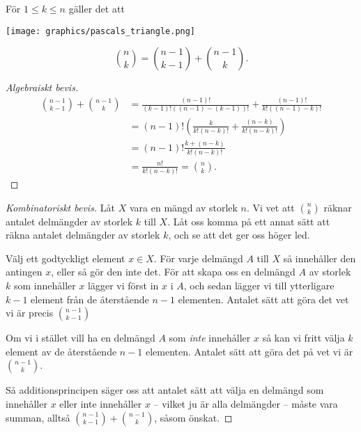 \documentclass[nobib]{tufte-handout}
\begin{document}
\begin{proposition}
  För $1 \leq k \leq n$ gäller det att
  
  \begin{marginfigure}
    \texttt{[image: graphics/pascals\_triangle.png]}
  \end{marginfigure}
  $$\binom{n}{k} = \binom{n-1}{k-1} + \binom{n-1}{k}.$$

  \begin{proof}[Algebraiskt bevis]
    \begin{align*}
      \binom{n-1}{k-1} + \binom{n-1}{k} &= \frac{(n-1)!}{(k-1)!((n-1)-(k-1))!} + \frac{(n-1)!}{k!((n-1)-k)!}\\
      &= (n-1)!\left(\frac{k}{k!(n-k)!} + \frac{(n-k)}{k!(n-k)!}\right)\\
      &= (n-1)!\frac{k + (n - k)}{k!(n-k)!}\\
      &= \frac{n!}{k!(n-k)!} = \binom{n}{k}.
    \end{align*}    
  \end{proof}

  \begin{proof}[Kombinatoriskt bevis]
    Låt $X$ vara en mängd av storlek $n$. Vi vet att $\binom{n}{k}$ räknar antalet delmängder av storlek $k$ till $X$. Låt oss komma på ett annat sätt att räkna antalet delmängder av storlek $k$, och se att det ger oss höger led.

    Välj ett godtyckligt element $x \in X$. För varje delmängd $A$ till $X$ så innehåller den antingen $x$, eller så gör den inte det. För att skapa oss en delmängd $A$ av storlek $k$ som innehåller $x$ lägger vi först in $x$ i $A$, och sedan lägger vi till ytterligare $k-1$ element från de återstående $n-1$ elementen. Antalet sätt att göra det vet vi är precis $\binom{n-1}{k-1}$

    Om vi i stället vill ha en delmängd $A$ som \emph{inte} innehåller $x$ så kan vi fritt välja $k$ element av de återstående $n-1$ elementen. Antalet sätt att göra det på vet vi är $\binom{n-1}{k}$.

    Så additionsprincipen säger oss att antalet sätt att välja en delmängd som innehåller $x$ eller inte innehåller $x$ -- vilket ju är alla delmängder -- måste vara summan, alltså $\binom{n-1}{k-1} + \binom{n-1}{k}$, såsom önskat.
  \end{proof}
\end{proposition}
\end{document}

